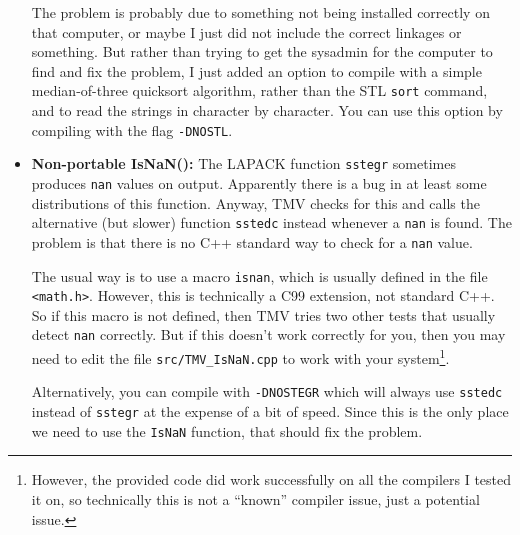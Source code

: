 \documentclass[twoside,letterpaper,11pt]{article}
\renewcommand{\tt}[1]{{\lstinline {#1}}}
\begin{document}
\begin{itemize}
The problem is probably due to something not being installed correctly on that
computer, or maybe I just did not include the correct linkages or something.  
But rather than trying to get the sysadmin for the computer to find and fix the problem, 
I just added an option to compile with a simple median-of-three
quicksort algorithm, rather than the STL \tt{sort} command, and to read the strings
in character by character.  You can use this option by compiling with the 
flag \texttt{-DNOSTL}.  

\item {\bf Non-portable IsNaN():}
The LAPACK function \tt{sstegr} sometimes produces \tt{nan} values on output.
Apparently there is a bug in at least some distributions of this function.
Anyway, TMV checks for this and calls the alternative (but slower) function
\tt{sstedc} instead whenever a \tt{nan} is found.  
The problem is that there is no C++ standard way to check
for a \tt{nan} value.  

The usual way is to use a macro \tt{isnan}, which is usually
defined in the file \tt{<math.h>}.  However, this is technically a C99 extension,
not standard C++.  So if this macro is not defined, then TMV tries two other
tests that usually detect \tt{nan} correctly.  But if this doesn't work correctly
for you, then you may need to edit the file \texttt{src/TMV\_IsNaN.cpp} to work
with your system\footnote{
However, the provided code did work successfully on all the compilers I 
tested it on, so technically this is not a ``known'' compiler issue, just a 
potential issue.}.

Alternatively, you can compile with \texttt{-DNOSTEGR} which will always
use \tt{sstedc} instead of \tt{sstegr} at the expense of a bit of speed.
Since this is the only place we need to use the \tt{IsNaN} function, that 
should fix the problem.

\end{itemize}
\end{document}
